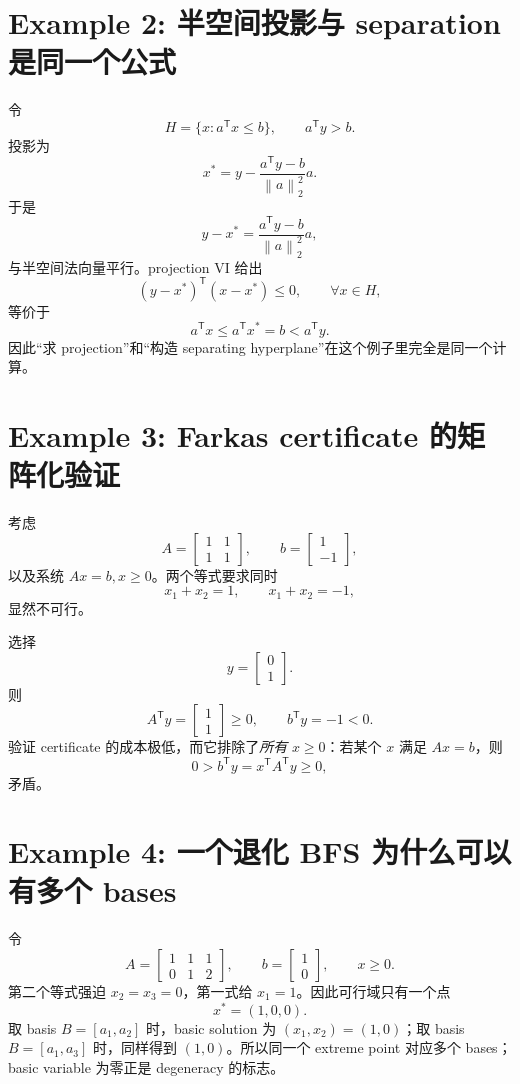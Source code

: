 \documentclass[11pt,a4paper,openany]{ctexrep}
\theoremstyle{definition}
\newcommand{\norm}[1]{\left\lVert #1\right\rVert}
\newcommand{\transpose}{\mathsf{T}}
\begin{document}
\section{Example 2: 半空间投影与 separation 是同一个公式}
令
\[
H=\{x:a^\transpose x\le b\},\qquad a^\transpose y>b.
\]
投影为
\[
x^*=y-\frac{a^\transpose y-b}{\norm a_2^2}a.
\]
于是
\[
y-x^*=\frac{a^\transpose y-b}{\norm a_2^2}a,
\]
与半空间法向量平行。projection VI 给出
\[
(y-x^*)^\transpose(x-x^*)\le0,\qquad \forall x\in H,
\]
等价于
\[
a^\transpose x\le a^\transpose x^*=b<a^\transpose y.
\]
因此“求 projection”和“构造 separating hyperplane”在这个例子里完全是同一个计算。

\section{Example 3: Farkas certificate 的矩阵化验证}
考虑
\[
A=\begin{bmatrix}1&1\\1&1\end{bmatrix},\qquad
b=\begin{bmatrix}1\\-1\end{bmatrix},
\]
以及系统 $Ax=b,x\ge0$。两个等式要求同时
\[
x_1+x_2=1,\qquad x_1+x_2=-1,
\]
显然不可行。

选择
\[
y=\begin{bmatrix}0\\1\end{bmatrix}.
\]
则
\[
A^\transpose y=\begin{bmatrix}1\\1\end{bmatrix}\ge0,
\qquad
b^\transpose y=-1<0.
\]
验证 certificate 的成本极低，而它排除了\emph{所有} $x\ge0$：若某个 $x$ 满足 $Ax=b$，则
\[
0>b^\transpose y=x^\transpose A^\transpose y\ge0,
\]
矛盾。

\section{Example 4: 一个退化 BFS 为什么可以有多个 bases}
令
\[
A=\begin{bmatrix}
1&1&1\\
0&1&2
\end{bmatrix},
\qquad
b=\begin{bmatrix}1\\0\end{bmatrix},
\qquad x\ge0.
\]
第二个等式强迫 $x_2=x_3=0$，第一式给 $x_1=1$。因此可行域只有一个点
\[
x^*=(1,0,0).
\]
取 basis $B=[a_1,a_2]$ 时，basic solution 为 $(x_1,x_2)=(1,0)$；取 basis $B=[a_1,a_3]$ 时，同样得到 $(1,0)$。所以同一个 extreme point 对应多个 bases；basic variable 为零正是 degeneracy 的标志。
\end{document}
